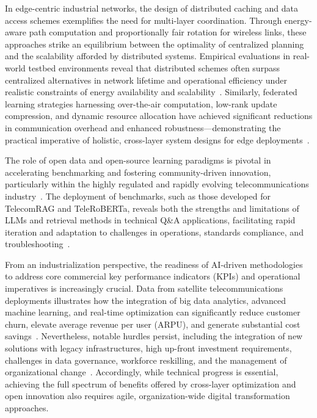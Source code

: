 \documentclass[11pt]{article}
\begin{document}
In edge-centric industrial networks, the design of distributed caching and data access schemes exemplifies the need for multi-layer coordination. Through energy-aware path computation and proportionally fair rotation for wireless links, these approaches strike an equilibrium between the optimality of centralized planning and the scalability afforded by distributed systems. Empirical evaluations in real-world testbed environments reveal that distributed schemes often surpass centralized alternatives in network lifetime and operational efficiency under realistic constraints of energy availability and scalability~\cite{ref14}. Similarly, federated learning strategies harnessing over-the-air computation, low-rank update compression, and dynamic resource allocation have achieved significant reductions in communication overhead and enhanced robustness—demonstrating the practical imperative of holistic, cross-layer system designs for edge deployments~\cite{ref12}.

The role of open data and open-source learning paradigms is pivotal in accelerating benchmarking and fostering community-driven innovation, particularly within the highly regulated and rapidly evolving telecommunications industry~\cite{ref11,ref21,ref22,ref23}. The deployment of benchmarks, such as those developed for TelecomRAG and TeleRoBERTa, reveals both the strengths and limitations of LLMs and retrieval methods in technical Q\&A applications, facilitating rapid iteration and adaptation to challenges in operations, standards compliance, and troubleshooting~\cite{ref23,ref29}.

From an industrialization perspective, the readiness of AI-driven methodologies to address core commercial key performance indicators (KPIs) and operational imperatives is increasingly crucial. Data from satellite telecommunications deployments illustrates how the integration of big data analytics, advanced machine learning, and real-time optimization can significantly reduce customer churn, elevate average revenue per user (ARPU), and generate substantial cost savings~\cite{ref49}. Nevertheless, notable hurdles persist, including the integration of new solutions with legacy infrastructures, high up-front investment requirements, challenges in data governance, workforce reskilling, and the management of organizational change~\cite{ref49}. Accordingly, while technical progress is essential, achieving the full spectrum of benefits offered by cross-layer optimization and open innovation also requires agile, organization-wide digital transformation approaches.
\end{document}
